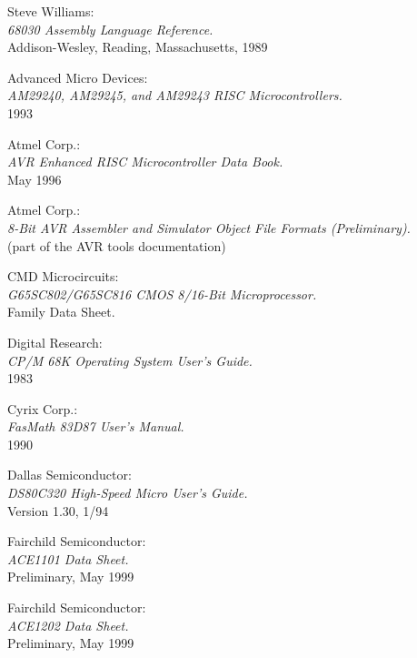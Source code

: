 \documentclass[12pt,twoside]{report}
\begin{document}
\cleardoublepage
\begin{thebibliography}{99}

 Steve Williams: \\
                   {\em 68030 Assembly Language Reference.\/} \\
		   Addison-Wesley, Reading, Massachusetts, 1989

 Advanced Micro Devices: \\
		 {\em AM29240, AM29245, and AM29243 RISC
                  Microcontrollers.\/} \\
		 1993

 Atmel Corp.: \\
                {\em AVR Enhanced RISC Microcontroller Data Book.\/} \\ 
                May 1996

 Atmel Corp.: \\
                 {\em 8-Bit AVR Assembler and Simulator Object File
                  Formats (Preliminary).\/} \\
                 (part of the AVR tools documentation)

 CMD Microcircuits: \\
                {\em G65SC802/G65SC816 CMOS 8/16-Bit Microprocessor.\/} \\
		Family Data Sheet.

 Digital Research: \\
                 {\em CP/M 68K Operating System User's Guide.\/} \\
        	 1983

 Cyrix Corp.: \\
                {\em FasMath 83D87 User's Manual.\/} \\
		1990

 Dallas Semiconductor: \\
		    {\em DS80C320 High-Speed Micro User's Guide.\/} \\
                    Version 1.30, 1/94

 Fairchild Semiconductor: \\
                   {\em ACE1101 Data Sheet.\/} \\
                   Preliminary, May 1999

 Fairchild Semiconductor: \\
                   {\em ACE1202 Data Sheet.\/} \\
                   Preliminary, May 1999


\end{thebibliography}
\end{document}
